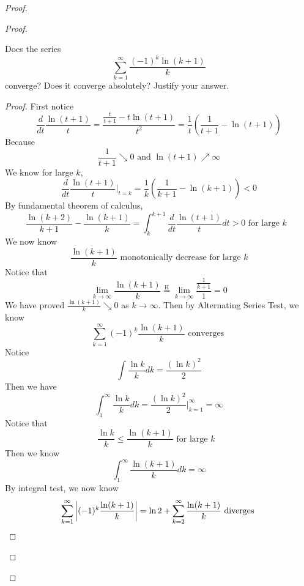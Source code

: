 \documentclass{report}
\begin{document}
\begin{proof}
\begin{proof}
\begin{question}{}{}
Does the series
\[
\sum_{k=1}^{\infty} \frac{(-1)^k \ln(k + 1)}{k}
\]
converge? Does it converge absolutely? Justify your answer.
\end{question}
\begin{proof}
First notice
\begin{equation}
\frac{d}{dt}\frac{\ln (t+1)}{t} =\frac{\frac{t}{t+1}-t \ln (t+1)}{t^2}=\frac{1}{t}(\frac{1}{t+1}-\ln (t+1))
\end{equation}
Because 
\begin{equation}
\frac{1}{t+1}\searrow 0\text{ and }\ln (t+1)\nearrow \infty
\end{equation}
We know for large $k$, 
\begin{equation}
\frac{d}{dt}\frac{\ln (t+1)}{t} \bigg|_{t=k} =\frac{1}{k}(\frac{1}{k+1}-\ln (k+1))<0
\end{equation}
By fundamental theorem of calculus, 
\begin{equation}
\frac{\ln (k+2)}{k+1}-\frac{\ln (k+1)}{k}=\int_{k}^{k+1} \frac{d}{dt} \frac{\ln (t+1)}{t}dt>0\text{ for large $k$ }
\end{equation}
We now know 
\begin{equation}
\frac{\ln (k+1)}{k}\text{ monotonically decrease for large $k$}
\end{equation}
Notice that 
\begin{equation}
\lim_{k\to\infty} \frac{\ln (k+1)}{k}\stackrel{\mathrm{H}}{=}\lim_{k\to\infty} \frac{\frac{1}{k+1}}{1}=0
\end{equation}
We have proved $\frac{\ln (k+1)}{k}\searrow 0$ as $k\to\infty$. Then by Alternating Series Test, we know 
\begin{equation}
\sum_{k=1}^\infty (-1)^k \frac{\ln (k+1)}{k}\text{ converges }
\end{equation}
Notice 
\begin{equation}
\int \frac{\ln k}{k}dk=\frac{(\ln k)^2}{2}
\end{equation}
Then we have
\begin{equation}
\int_{1}^\infty \frac{\ln k}{k}dk= \frac{(\ln k)^2}{2}\bigg|_{k=1}^\infty =\infty 
\end{equation}
Notice that 
\begin{equation}
\frac{\ln k}{k}\leq \frac{\ln (k+1)}{k}\text{ for large $k$ }
\end{equation}
Then we know
\begin{equation}
\int_1^\infty \frac{\ln (k+1)}{k}dk =\infty
\end{equation}
By integral test, we now know 
\begin{equation}
\sum_{k=1}^\infty \left|(-1)^k \frac{\ln (k+1)}{k}\right|=\ln 2+\sum_{k=2}^\infty \frac{\ln (k+1)}{k}\text{ diverges }
\end{equation}



\end{proof}
\end{proof}
\end{proof}
\end{document}
